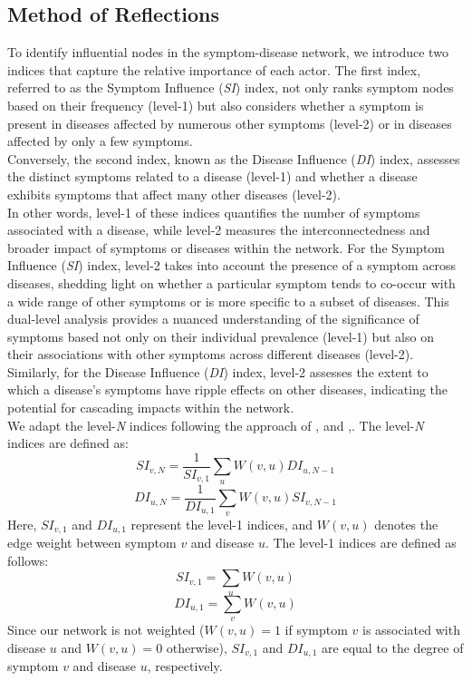 \subsection{Method of Reflections}

To identify influential nodes in the symptom-disease network, we introduce two indices that capture the relative importance of each actor.
The first index, referred to as the Symptom Influence (\textit{SI}) index, not only ranks symptom nodes based on their frequency (level-1)
but also considers whether a symptom is present in diseases affected by numerous other symptoms (level-2) or in diseases affected by only a few symptoms.\\
Conversely, the second index, known as the Disease Influence (\textit{DI}) index,
assesses the distinct symptoms related to a disease (level-1) and whether a disease exhibits symptoms that affect many other diseases (level-2).\\
In other words, level-1 of these indices quantifies the number of symptoms associated with a disease,
while level-2 measures the interconnectedness and broader impact of symptoms or diseases within the network.
For the Symptom Influence (\textit{SI}) index, level-2 takes into account the presence of a symptom across diseases,
shedding light on whether a particular symptom tends to co-occur with a wide range of other symptoms or is more specific to a subset of diseases.
This dual-level analysis provides a nuanced understanding of the significance of symptoms based not only on their individual prevalence (level-1)
but also on their associations with other symptoms across different diseases (level-2). Similarly, for the Disease Influence (\textit{DI}) index,
level-2 assesses the extent to which a disease's symptoms have ripple effects on other diseases, indicating the potential for cascading impacts within the network.\\
We adapt the level-\textit{N} indices following the approach of \citeauthor{Hidalgo_2007},\cite{Hidalgo_2007} and  \citeauthor{Hidalgo_2009},\cite{Hidalgo_2009}.
The level-\textit{N} indices are defined as:
\begin{equation}
    SI_{v, N} = \frac{1}{SI_{v, 1}} \sum_u W(v, u) DI_{u, N-1}
\end{equation}
\begin{equation}
    DI_{u, N} = \frac{1}{DI_{u, 1}} \sum_v W(v, u) SI_{v, N-1}
\end{equation}
\noindent
Here, $SI_{v, 1}$ and $DI_{u, 1}$ represent the level-1 indices, and $W(v,u)$ denotes the edge weight between symptom $v$ and disease $u$.
The level-1 indices are defined as follows:
\begin{equation}
    SI_{v, 1} = \sum_u W(v, u)
\end{equation}
\begin{equation}
    DI_{u, 1} = \sum_v W(v, u)
\end{equation}
\noindent
Since our network is not weighted ($W(v,u)=1$ if symptom $v$ is associated with disease $u$ and $W(v,u)=0$ otherwise),
$SI_{v,1}$ and $DI_{u,1}$ are equal to the degree of symptom $v$ and disease $u$, respectively.

